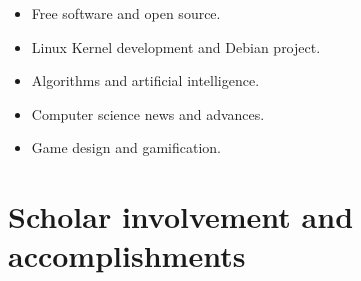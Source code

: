 \documentclass{res}
\newcommand{\inFrench}[1]{}
\newcommand{\inEnglish}[1]{#1}
\begin{document}
\begin{resume}
\inEnglish{
	\vspace{6pt}
	\begin{itemize} \itemsep -2pt
		\item Free software and open source.
		\item Linux Kernel development and Debian project.
		\item Algorithms and artificial intelligence.
		\item Computer science news and advances.
		\item Game design and gamification.
	\end{itemize}
}

\inFrench{
	\section{Implication scolaire et accomplissements}
}
\inEnglish{
	\section{Scholar involvement and accomplishments}
}
\vspace{6pt}

\inFrench{
	{\sl Membre du club Formule ÉTS} \hfill (Club étudiant)
	\vspace{0.05in}
	\begin{itemize} \itemsep -2pt
		\item Création d’un document de vision ainsi qu’un document de spécification des requis pour une application de télémétrie en temps réel;
		\item Prototypage d'une application de télémétrie en temps-réel en JavaScript.
	\end{itemize}

	{\sl Membre du club Conjure} \hfill (Club étudiant)
	\vspace{0.05in}
	\begin{itemize} \itemsep -2pt
		\item Création d’un jeu en C\# avec le logiciel Unity;
		\item Gestion du projet.
	\end{itemize}

	{\sl Promotion du programme collégial} \hfill (Cégep)
	\vspace{0.05in}
	\begin{itemize} \itemsep -2pt
		\item Entrevue avec le journal régional pour la promotion du programme collégial;
		\item Participation aux portes ouvertes pour la présentation des projets accomplis durant mon parcours.
	\end{itemize}

}
\end{resume}
\end{document}
